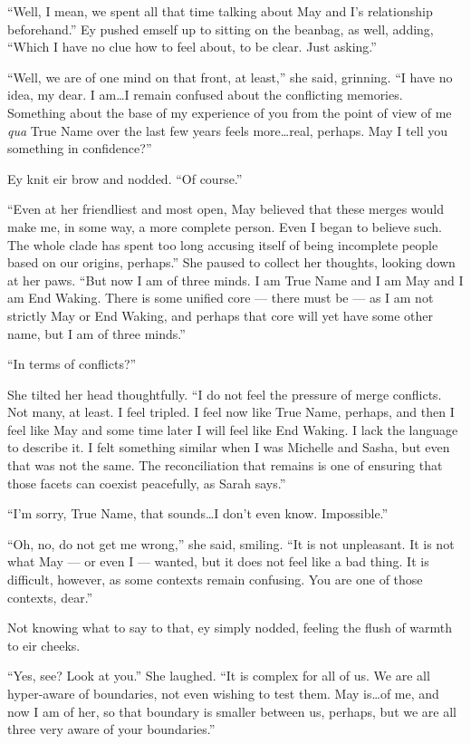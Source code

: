 ``Well, I mean, we spent all that time talking about May and I's relationship beforehand.'' Ey pushed emself up to sitting on the beanbag, as well, adding, ``Which I have no clue how to feel about, to be clear. Just asking.''

``Well, we are of one mind on that front, at least,'' she said, grinning. ``I have no idea, my dear. I am\ldots I remain confused about the conflicting memories. Something about the base of my experience of you from the point of view of me \emph{qua} True Name over the last few years feels more\ldots real, perhaps. May I tell you something in confidence?''

Ey knit eir brow and nodded. ``Of course.''

``Even at her friendliest and most open, May believed that these merges would make me, in some way, a more complete person. Even I began to believe such. The whole clade has spent too long accusing itself of being incomplete people based on our origins, perhaps.'' She paused to collect her thoughts, looking down at her paws. ``But now I am of three minds. I am True Name and I am May and I am End Waking. There is some unified core — there must be — as I am not strictly May or End Waking, and perhaps that core will yet have some other name, but I am of three minds.''

``In terms of conflicts?''

She tilted her head thoughtfully. ``I do not feel the pressure of merge conflicts. Not many, at least. I feel tripled. I feel now like True Name, perhaps, and then I feel like May and some time later I will feel like End Waking. I lack the language to describe it. I felt something similar when I was Michelle and Sasha, but even that was not the same. The reconciliation that remains is one of ensuring that those facets can coexist peacefully, as Sarah says.''

``I'm sorry, True Name, that sounds\ldots I don't even know. Impossible.''

``Oh, no, do not get me wrong,'' she said, smiling. ``It is not unpleasant. It is not what May — or even I — wanted, but it does not feel like a bad thing. It is difficult, however, as some contexts remain confusing. You are one of those contexts, dear.''

Not knowing what to say to that, ey simply nodded, feeling the flush of warmth to eir cheeks.

``Yes, see? Look at you.'' She laughed. ``It is complex for all of us. We are all hyper-aware of boundaries, not even wishing to test them. May is\ldots of me, and now I am of her, so that boundary is smaller between us, perhaps, but we are all three very aware of your boundaries.''

